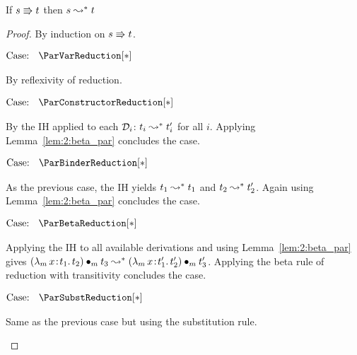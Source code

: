 \begin{lemma}
    If $s \Rrightarrow t$ then $s \leadsto^* t$
    \label{lem:a:par_implies_beta_step}
\end{lemma}
\begin{proof}
    By induction on $s \Rrightarrow t$.

    $\text{Case: }\begin{array}{c} \ParVarReduction[*] \end{array}$
    \begin{proofcase}
        By reflexivity of reduction.
    \end{proofcase}

    $\text{Case: }\begin{array}{c} \ParConstructorReduction[*] \end{array}$
    \begin{proofcase}
        By the IH applied to each $\mathcal{D}_{i}$: $t_i \leadsto^* t_i^\prime$ for all $i$.
        Applying Lemma~\ref{lem:2:beta_par} concludes the case.
    \end{proofcase}

    $\text{Case: }\begin{array}{c} \ParBinderReduction[*] \end{array}$
    \begin{proofcase}
        As the previous case, the IH yields $t_1 \leadsto^* t_1$ and $t_2 \leadsto^* t_2^\prime$.
        Again using Lemma~\ref{lem:2:beta_par} concludes the case.
    \end{proofcase}

    $\text{Case: }\begin{array}{c} \ParBetaReduction[*] \end{array}$
    \begin{proofcase}
        Applying the IH to all available derivations and using Lemma~\ref{lem:2:beta_par} gives $({\lambda_m}\, x\! : \! t_1.\, t_2) \bullet_{m} t_3 \leadsto^* ({\lambda_m}\, x\! : \! t_1^\prime.\, t_2^\prime) \bullet_{m} t_3^\prime$.
        Applying the beta rule of reduction with transitivity concludes the case.
    \end{proofcase}

    $\text{Case: }\begin{array}{c} \ParSubstReduction[*] \end{array}$
    \begin{proofcase}
        Same as the previous case but using the substitution rule.
    \end{proofcase}


\end{proof}
